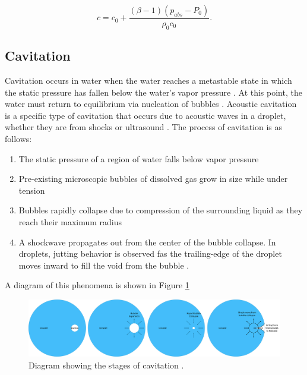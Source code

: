 \documentclass{UCF_ETD}
\begin{document}
\begin{equation}
    c = c_{0} + \frac{\left( \beta -1 \right) \left( p_{abs} - P_{0} \right)}{\rho_{0}c_{0}}.
    \label{eq:nonlinearsound}
\end{equation}



\subsection{Cavitation}
Cavitation occurs in water when the water reaches a metastable state in which the static pressure has fallen below the water's vapor pressure \cite{CAUPIN20061000}. At this point, the water must return to equilibrium via nucleation of bubbles \cite{CAUPIN20061000}. Acoustic cavitation is a specific type of cavitation that occurs due to acoustic waves in a droplet, whether they are from shocks \cite{kedrinskii2007shock} or ultrasound \cite{Yasui2018}. The process of cavitation is as follows:

\begin{enumerate}
    \item The static pressure of a region of water falls below vapor pressure
    \item Pre-existing microscopic bubbles of dissolved gas grow in size \cite{Plesset1977} while under tension
    \item Bubbles rapidly collapse due to compression of the surrounding liquid as they reach their maximum radius
    \item A shockwave propagates out from the center of the bubble collapse. In droplets, jutting behavior is observed fas the trailing-edge of the droplet moves inward to fill the void from the bubble \cite{REESE2024104822,Fan2024}.
\end{enumerate}

A diagram of this phenomena is shown in Figure \ref{fig:cavDiagram}

\begin{figure}
    \centering
    \includegraphics[width=\linewidth]{Figures/cavDiagram.png}
    \caption{Diagram showing the stages of cavitation \cite{Plesset1977, Yasui2018, kedrinskii2007shock}.}
    \label{fig:cavDiagram}
\end{figure}
\end{document}
